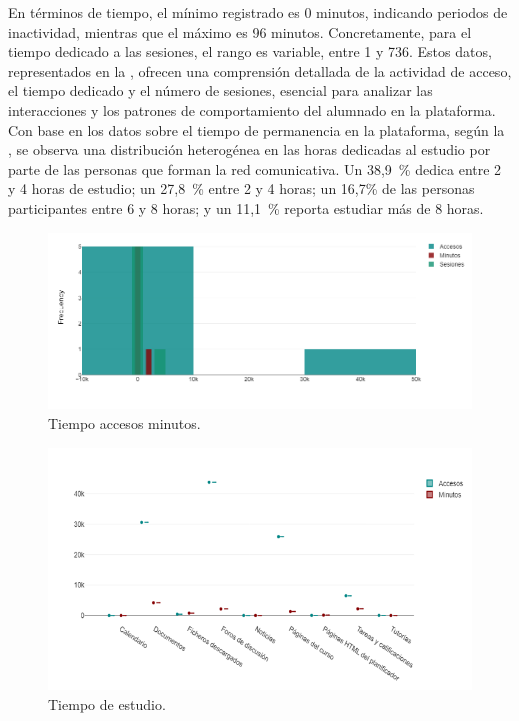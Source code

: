 En términos de tiempo, el mínimo registrado es 0 minutos, indicando
periodos de inactividad, mientras que el máximo es 96 minutos.
Concretamente, para el tiempo dedicado a las sesiones, el rango es
variable, entre 1 y 736. Estos datos, representados en la ,
ofrecen una comprensión detallada de la actividad de acceso, el tiempo
dedicado y el número de sesiones, esencial para analizar las
interacciones y los patrones de comportamiento del alumnado en la
plataforma. Con base en los datos sobre el tiempo de permanencia en la
plataforma, según la , se observa una distribución heterogénea
en las horas dedicadas al estudio por parte de las personas que forman
la red comunicativa. Un 38,9~\% dedica entre 2 y 4 horas de estudio; un
27,8~\% entre 2 y 4 horas; un 16,7\% de las personas participantes entre
6 y 8 horas; y un 11,1~\% reporta estudiar más de 8 horas.
	
\begin{figure}[htbp]
\centering
\begin{minipage}{.85\textwidth}
\caption{Tiempo accesos minutos.}
\label{fig-01}
\includegraphics[width=\textwidth]{Imagem1.png}
\end{minipage}
\end{figure}
	
\begin{figure}[htbp]
\centering
\begin{minipage}{.85\textwidth}
\caption{Tiempo de estudio.}
\label{fig-02}
\includegraphics[width=\textwidth]{Imagem2.png}
\end{minipage}
\end{figure}		

